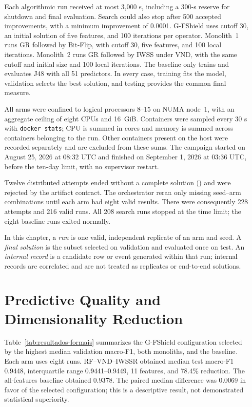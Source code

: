 Each algorithmic run received at most 3,000 s, including a 300-s reserve for shutdown and final evaluation. Search could also stop after 500 accepted improvements, with a minimum improvement of 0.0001. G-FShield uses cutoff 30, an initial solution of five features, and 100 iterations per operator. Monolith~1 runs GR followed by Bit-Flip, with cutoff 30, five features, and 100 local iterations. Monolith~2 runs GR followed by IWSS under VND, with the same cutoff and initial size and 100 local iterations. The baseline only trains and evaluates J48 with all 51 predictors. In every case, training fits the model, validation selects the best solution, and testing provides the common final measure.

All arms were confined to logical processors 8--15 on NUMA node~1, with an aggregate ceiling of eight CPUs and 16~GiB. Containers were sampled every 30 s with \texttt{docker stats}; CPU is summed in cores and memory is summed across containers belonging to the run. Other containers present on the host were recorded separately and are excluded from these sums. The campaign started on August 25, 2026 at 08:32 UTC and finished on September 1, 2026 at 03:36 UTC, before the ten-day limit, with no supervisor restart.

Twelve distributed attempts ended without a complete solution () and were rejected by the artifact contract. The orchestrator reran only missing seed--arm combinations until each arm had eight valid results. There were consequently 228 attempts and 216 valid runs. All 208 search runs stopped at the time limit; the eight baseline runs exited normally.

In this chapter, a \emph{run} is one valid, independent replicate of an arm and seed. A \emph{final solution} is the subset selected on validation and evaluated once on test. An \emph{internal record} is a candidate row or event generated within that run; internal records are correlated and are not treated as replicates or end-to-end solutions.

\section{Predictive Quality and Dimensionality Reduction}

Table~\ref{tab:resultados-formais} summarizes the G-FShield configuration selected by the highest median validation macro-F1, both monoliths, and the baseline. Each arm uses eight runs. RF--VND--IWSSR obtained median test macro-F1 0.9448, interquartile range 0.9441--0.9449, 11 features, and 78.4\% reduction. The all-features baseline obtained 0.9378. The paired median difference was 0.0069 in favor of the selected configuration; this is a descriptive result, not demonstrated statistical superiority.

